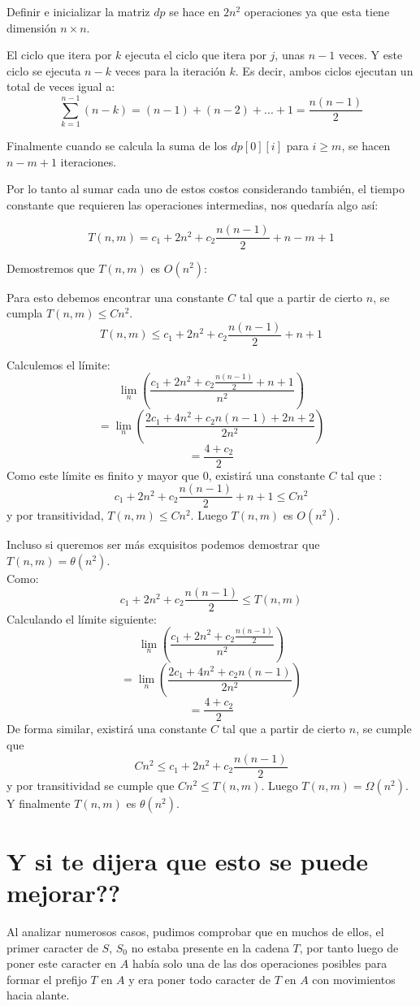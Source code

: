 \documentclass[a4paper]{article}
\begin{document}
	Definir e inicializar la matriz $dp$ se hace en $2n^2$ operaciones ya que esta tiene dimensión $n \times n$.
	
	El ciclo que itera por $k$ ejecuta el ciclo que itera por $j$, unas $n-1$ veces. Y este ciclo se ejecuta $n-k$ veces para la iteración $k$. Es decir, ambos ciclos ejecutan un total de veces igual a:
	$$ \sum_{k=1}^{n-1} (n-k) = (n-1) + (n-2) + ... + 1 = \frac{n(n-1)}{2} $$
	
	Finalmente cuando se calcula la suma de los $dp[0][i]$ para $i \geq m$, se hacen $n-m + 1$ iteraciones.
	
	Por lo tanto al sumar cada uno de estos costos considerando también, el tiempo constante que requieren las operaciones intermedias, nos quedaría algo así:
	
	$$T(n,m) = c_1 + 2n^2 + c_2\frac{n(n-1)}{2} + n-m+1$$
	
	Demostremos que $T(n,m)$ es $O(n^2)$:
	
	Para esto debemos encontrar una constante $C$ tal que a partir de cierto $n$, se cumpla $T(n,m) \leq Cn^2$.
	$$T(n,m) \leq c_1 + 2n^2 + c_2\frac{n(n-1)}{2} + n + 1$$
	
	Calculemos el límite:
	$$ \lim_{n}\left(\frac{c_1 + 2n^2 + c_2\frac{n(n-1)}{2} + n + 1}{n^2}\right)$$
	$$= \lim_{n}\left(\frac{2c_1 + 4n^2 + c_2n(n-1) + 2n + 2}{2n^2}\right)$$
	$$= \frac{4+c_2}{2}$$
	Como este límite es finito y mayor que $0$, existirá una constante $C$ tal que :
	$$ c_1 + 2n^2 + c_2\frac{n(n-1)}{2} + n + 1 \leq Cn^2$$
	y por transitividad, $ T(n,m) \leq Cn^2 $. Luego $T(n,m)$ es $O(n^2)$.
	
	Incluso si queremos ser más exquisitos podemos demostrar que $T(n,m) = \theta(n^2)$. \\
	
	Como:
	$$c_1 + 2n^2 + c_2\frac{n(n-1)}{2} \leq T(n,m)$$
	Calculando el límite siguiente:
	$$ \lim_{n}\left(\frac{c_1 + 2n^2 + c_2\frac{n(n-1)}{2}}{n^2}\right)$$
	$$= \lim_{n}\left(\frac{2c_1 + 4n^2 + c_2n(n-1)}{2n^2}\right)$$
	$$= \frac{4+c_2}{2}$$
	De forma similar, existirá una constante $C$ tal que a partir de cierto $n$, se cumple que 
	$$Cn^2 \leq c_1 + 2n^2 + c_2\frac{n(n-1)}{2}$$
	y por transitividad se cumple que $Cn^2 \leq T(n,m)$. Luego $T(n,m) = \Omega(n^2)$. Y finalmente $T(n,m)$ es $\theta(n^2)$.
	
    \section*{Y si te dijera que esto se puede mejorar??}
    Al analizar numerosos casos, pudimos comprobar que en muchos de ellos, el primer caracter de $S$, $S_0$ no estaba presente en la cadena $T$, por tanto 
    luego de poner este caracter en $A$ hab\'ia solo una de las dos operaciones posibles para formar el prefijo $T$ en $A$ y era poner todo caracter de 
    $T$ en $A$ con movimientos hacia alante.\\ 
\end{document}
